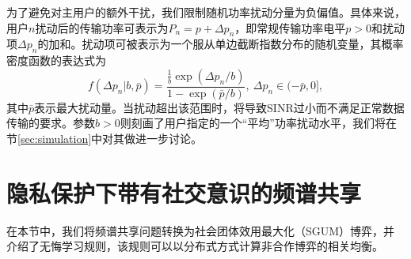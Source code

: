为了避免对主用户的额外干扰，我们限制随机功率扰动分量为负偏值。具体来说，用户$n$扰动后的传输功率可表示为$P_n=p+\Delta p_n$，即常规传输功率电平$p> 0$和扰动项$\Delta p_n$的加和。扰动项可被表示为一个服从单边截断指数分布的随机变量，其概率密度函数的表达式为
\begin{equation}\label{eq:noise}
f(\Delta p_n|b,\bar{p})=\frac{\frac{1}{b}\exp(\Delta p_n/b)}{1-\exp(\bar{p}/b)},~\Delta p_n\in(-\bar{p},0],
\end{equation}
其中$\bar{p}$表示最大扰动量。当扰动超出该范围时，将导致SINR过小而不满足正常数据传输的要求。参数$b>0$则刻画了用户指定的一个“平均”功率扰动水平，我们将在节\ref{sec:simulation}中对其做进一步讨论。


\section{隐私保护下带有社交意识的频谱共享}\label{sec:game}
在本节中，我们将频谱共享问题转换为社会团体效用最大化（SGUM）博弈，并介绍了无悔学习规则，该规则可以以分布式方式计算非合作博弈的相关均衡。

